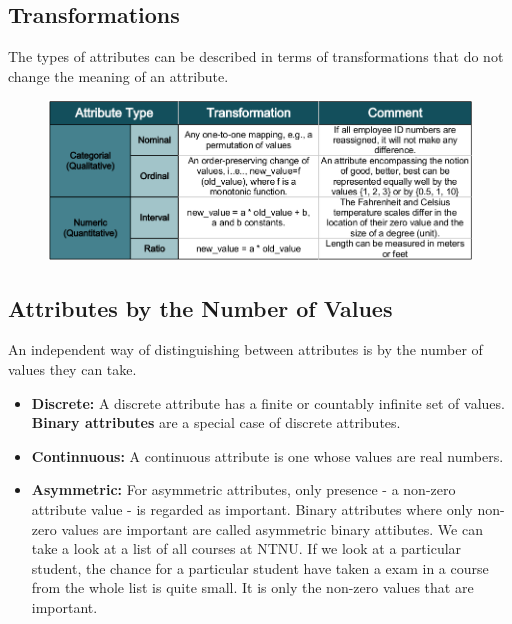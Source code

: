 	\clearpage
	\subsection{Transformations}

		The types of attributes can be described in terms of transformations that
		do not change the meaning of an attribute. 

		\begin{figure}[H]
			\includegraphics[width=\textwidth]{pics/transformations.png}
		\end{figure}

	\subsection{Attributes by the Number of Values}

	An independent way of distinguishing between attributes is by the number of values
	they can take.

	\begin{itemize}
		\item {\bf Discrete:} A discrete attribute has a finite or countably infinite
		set of values. {\bf Binary attributes} are a special case of discrete attributes. 
		\item {\bf Continnuous:} A continuous attribute is one whose values are real numbers.
		\item {\bf Asymmetric:} For asymmetric attributes, only presence - a non-zero attribute
		value - is regarded as important. Binary attributes where only non-zero values are 
		important are called asymmetric binary attibutes. We can take a look at a list of all 
		courses at NTNU. If we look at a particular student, the chance for a particular student
		have taken a exam in a course from the whole list is quite small. It is only the non-zero
		values that are important. 
	\end{itemize}

	\clearpage
